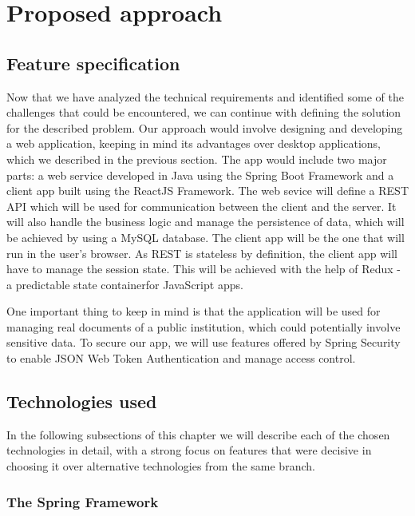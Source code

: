 \chapter{Proposed approach}
\label{chapter:proposedApproach}


\section{Feature specification}
\label{section:featureSpecification}

Now that we have analyzed the technical requirements and identified some of the challenges that could be encountered, we can continue with defining the solution for the described problem. Our approach would involve designing and developing a web application, keeping in mind its advantages over desktop applications, which we described in the previous section. The app would include two major parts: a web service developed in Java using the Spring Boot Framework and a client app built using the ReactJS Framework. The web sevice will define a REST API which will be used for communication between the client and the server. It will also handle the business logic and manage the persistence of data, which will be achieved by using a MySQL database. The client app will be the one that will run in the user's browser. As REST is stateless by definition, the client app will have to manage the session state. This will be achieved with the help of Redux - a predictable state containerfor JavaScript apps.

One important thing to keep in mind is that the application will be used for managing real documents of a public institution, which could potentially involve sensitive data. To secure our app, we will use features offered by Spring Security to enable JSON Web Token Authentication and manage access control.



\section{Technologies used}
\label{section:technologiesUsed}

In the following subsections of this chapter we will describe each of the chosen technologies in detail, with a strong focus on features that were decisive in choosing it over alternative technologies from the same branch.


\subsection{The Spring Framework}
\label{subsection:theSpringFramework}

